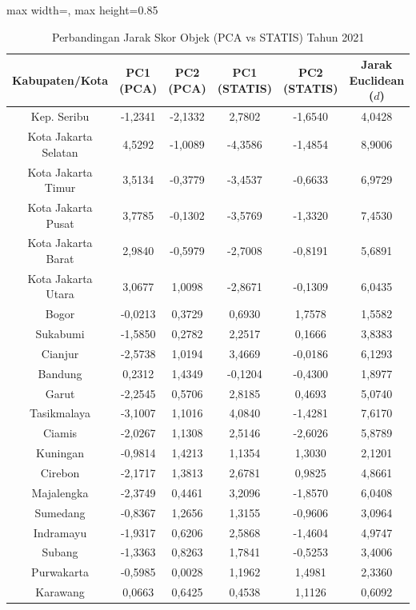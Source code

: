 \begin{table}[H]
\centering
\caption{Perbandingan Jarak Skor Objek (PCA vs STATIS) Tahun 2021} \label{tab:app2jarak_skor_2021}
\begin{adjustbox}{max width=\textwidth, max height=0.85\textheight}
\begin{tabular}{|c|c|c|c|c|c|}
\hline
\textbf{Kabupaten/Kota} & \textbf{PC1 (PCA)} & \textbf{PC2 (PCA)} & \textbf{PC1 (STATIS)} & \textbf{PC2 (STATIS)} & \textbf{Jarak Euclidean ($d$)} \\
\hline
Kep. Seribu & -1,2341 & -2,1332 & 2,7802 & -1,6540 & 4,0428 \\
Kota Jakarta Selatan & 4,5292 & -1,0089 & -4,3586 & -1,4854 & 8,9006 \\
Kota Jakarta Timur & 3,5134 & -0,3779 & -3,4537 & -0,6633 & 6,9729 \\
Kota Jakarta Pusat & 3,7785 & -0,1302 & -3,5769 & -1,3320 & 7,4530 \\
Kota Jakarta Barat & 2,9840 & -0,5979 & -2,7008 & -0,8191 & 5,6891 \\
Kota Jakarta Utara & 3,0677 & 1,0098 & -2,8671 & -0,1309 & 6,0435 \\
Bogor & -0,0213 & 0,3729 & 0,6930 & 1,7578 & 1,5582 \\
Sukabumi & -1,5850 & 0,2782 & 2,2517 & 0,1666 & 3,8383 \\
Cianjur & -2,5738 & 1,0194 & 3,4669 & -0,0186 & 6,1293 \\
Bandung & 0,2312 & 1,4349 & -0,1204 & -0,4300 & 1,8977 \\
Garut & -2,2545 & 0,5706 & 2,8185 & 0,4693 & 5,0740 \\
Tasikmalaya & -3,1007 & 1,1016 & 4,0840 & -1,4281 & 7,6170 \\
Ciamis & -2,0267 & 1,1308 & 2,5146 & -2,6026 & 5,8789 \\
Kuningan & -0,9814 & 1,4213 & 1,1354 & 1,3030 & 2,1201 \\
Cirebon & -2,1717 & 1,3813 & 2,6781 & 0,9825 & 4,8661 \\
Majalengka & -2,3749 & 0,4461 & 3,2096 & -1,8570 & 6,0408 \\
Sumedang & -0,8367 & 1,2656 & 1,3155 & -0,9606 & 3,0964 \\
Indramayu & -1,9317 & 0,6206 & 2,5868 & -1,4604 & 4,9747 \\
Subang & -1,3363 & 0,8263 & 1,7841 & -0,5253 & 3,4006 \\
Purwakarta & -0,5985 & 0,0028 & 1,1962 & 1,4981 & 2,3360 \\
Karawang & 0,0663 & 0,6425 & 0,4538 & 1,1126 & 0,6092 \\

\end{tabular}
\end{adjustbox}
\end{table}
